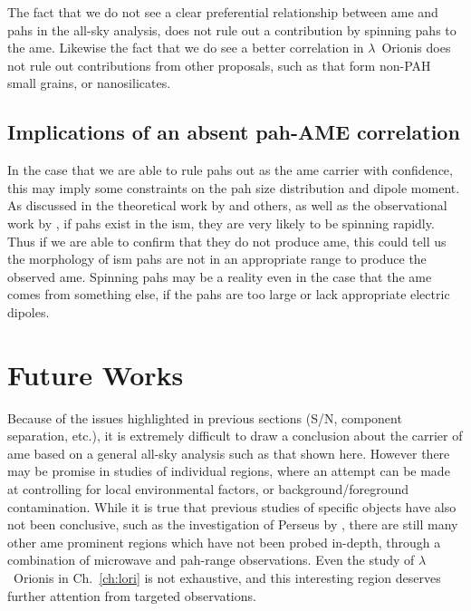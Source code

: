               The fact that we do not see a clear preferential relationship between \acrshort{ame} and \acrshort{pah}s in the all-sky analysis, does not rule out a contribution by spinning \acrshort{pah}s to the \acrshort{ame}. Likewise the fact that we do see a better correlation in $\lambda$~Orionis does not rule out contributions from other proposals, such as that form non-PAH small grains, or nanosilicates.


              \subsection{Implications of an absent \acrshort{pah}-AME correlation}
                  In the case that we are able to rule \acrshort{pah}s out as the \acrshort{ame} carrier with confidence, this may imply some constraints on the \acrshort{pah} size distribution and dipole moment. As discussed in the theoretical work by \cite{draine98a, ali-haimoud10} and others, as well as the observational work by \cite{hensley16}, if \acrshort{pah}s exist in the \acrshort{ism}, they are very likely to be spinning rapidly. Thus if we are able to confirm that they do not produce \acrshort{ame}, this could tell us the morphology of \acrshort{ism} \acrshort{pah}s are not in an appropriate range to produce the observed \acrshort{ame}. Spinning \acrshort{pah}s may be a reality even in the case that the \acrshort{ame} comes from something else, if the \acrshort{pah}s are too large or lack appropriate electric dipoles.

              \section{Future Works}
                  Because of the issues highlighted in previous sections (S/N, component separation, etc.), it is extremely difficult to draw a conclusion about the carrier of \acrshort{ame} based on a general all-sky analysis such as that shown here. However there may be promise in studies of individual regions, where an attempt can be made at controlling for local environmental factors, or background/foreground contamination. While it is true that previous studies of specific objects have also not been conclusive, such as the investigation of Perseus by \cite{tibbs11}, there are still many other \acrshort{ame} prominent regions which have not been probed in-depth, through a combination of microwave and \acrshort{pah}-range observations. Even the study of $\lambda$~Orionis in Ch.~\ref{ch:lori} is not exhaustive, and this interesting region deserves further attention from targeted observations.

